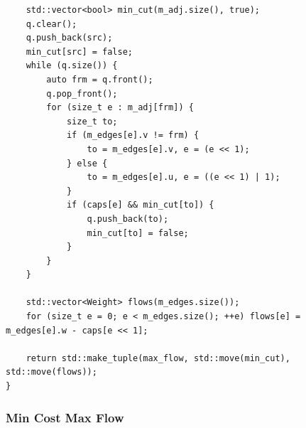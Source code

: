 \documentclass[UTF8]{article}
\begin{document}
\begin{verbatim}
	std::vector<bool> min_cut(m_adj.size(), true);
	q.clear();
	q.push_back(src);
	min_cut[src] = false;
	while (q.size()) {
		auto frm = q.front();
		q.pop_front();
		for (size_t e : m_adj[frm]) {
			size_t to;
			if (m_edges[e].v != frm) {
				to = m_edges[e].v, e = (e << 1);
			} else {
				to = m_edges[e].u, e = ((e << 1) | 1);
			}
			if (caps[e] && min_cut[to]) {
				q.push_back(to);
				min_cut[to] = false;
			}
		}
	}

	std::vector<Weight> flows(m_edges.size());
	for (size_t e = 0; e < m_edges.size(); ++e) flows[e] = m_edges[e].w - caps[e << 1];

	return std::make_tuple(max_flow, std::move(min_cut), std::move(flows));
}
\end{verbatim}

\subsubsection{Min Cost Max Flow}
\end{document}
